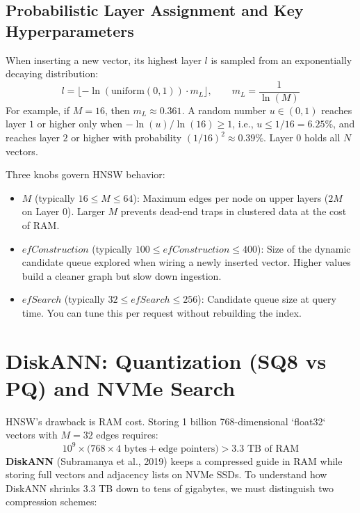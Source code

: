 \subsection{Probabilistic Layer Assignment and Key Hyperparameters}
When inserting a new vector, its highest layer $l$ is sampled from an exponentially decaying distribution:
\begin{equation}
l = \lfloor -\ln(\text{uniform}(0, 1)) \cdot m_L \rfloor, \qquad m_L = \frac{1}{\ln(M)}
\end{equation}
For example, if $M = 16$, then $m_L \approx 0.361$. A random number $u \in (0, 1)$ reaches layer $1$ or higher only when $-\ln(u)/\ln(16) \ge 1$, i.e., $u \le 1/16 = 6.25\%$, and reaches layer $2$ or higher with probability $(1/16)^2 \approx 0.39\%$. Layer 0 holds all $N$ vectors.

Three knobs govern HNSW behavior:
\begin{itemize}[leftmargin=18pt]
  \item \textbf{$M$} (typically $16 \le M \le 64$): Maximum edges per node on upper layers ($2M$ on Layer 0). Larger $M$ prevents dead-end traps in clustered data at the cost of RAM.
  \item \textbf{$efConstruction$} (typically $100 \le efConstruction \le 400$): Size of the dynamic candidate queue explored when wiring a newly inserted vector. Higher values build a cleaner graph but slow down ingestion.
  \item \textbf{$efSearch$} (typically $32 \le efSearch \le 256$): Candidate queue size at query time. You can tune this per request without rebuilding the index.
\end{itemize}

\section{DiskANN: Quantization (SQ8 vs PQ) and NVMe Search}

HNSW's drawback is RAM cost. Storing 1 billion 768-dimensional `float32` vectors with $M=32$ edges requires:
\begin{equation}
10^9 \times \bigl(768 \times 4\text{ bytes} + \text{edge pointers}\bigr) > 3.3\text{ TB of RAM}
\end{equation}
\textbf{DiskANN} (Subramanya et al., 2019) keeps a compressed guide in RAM while storing full vectors and adjacency lists on NVMe SSDs. To understand how DiskANN shrinks 3.3 TB down to tens of gigabytes, we must distinguish two compression schemes:

